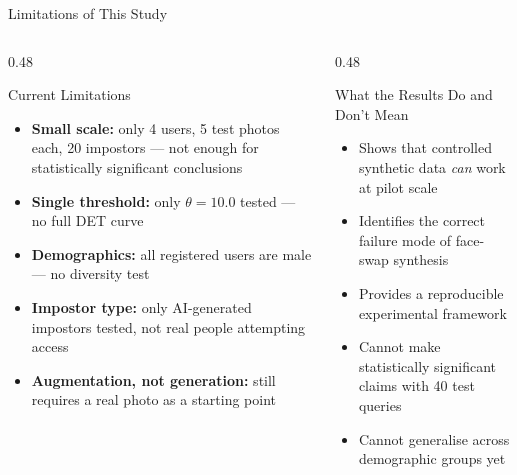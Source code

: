 \documentclass[aspectratio=169]{beamer}
\begin{document}
\begin{frame}{Limitations of This Study}

\begin{columns}[T]
\begin{column}{0.48\textwidth}
    \begin{alertblock}{Current Limitations}
        \begin{itemize}
            \item \textbf{Small scale:} only 4 users, 5 test photos each, 20 impostors — not enough for statistically significant conclusions
            \item \textbf{Single threshold:} only $\theta = 10.0$ tested — no full DET curve
            \item \textbf{Demographics:} all registered users are male — no diversity test
            \item \textbf{Impostor type:} only AI-generated impostors tested, not real people attempting access
            \item \textbf{Augmentation, not generation:} still requires a real photo as a starting point
        \end{itemize}
    \end{alertblock}
\end{column}
\begin{column}{0.48\textwidth}
    \begin{block}{What the Results Do and Don't Mean}
        \begin{itemize}
            \item[\checkmark] Shows that controlled synthetic data \textit{can} work at pilot scale
            \item[\checkmark] Identifies the correct failure mode of face-swap synthesis
            \item[\checkmark] Provides a reproducible experimental framework
            \vspace{4pt}
            \item[\alert{✗}] Cannot make statistically significant claims with 40 test queries
            \item[\alert{✗}] Cannot generalise across demographic groups yet
        \end{itemize}
    \end{block}
\end{column}
\end{columns}
\end{frame}
\end{document}
